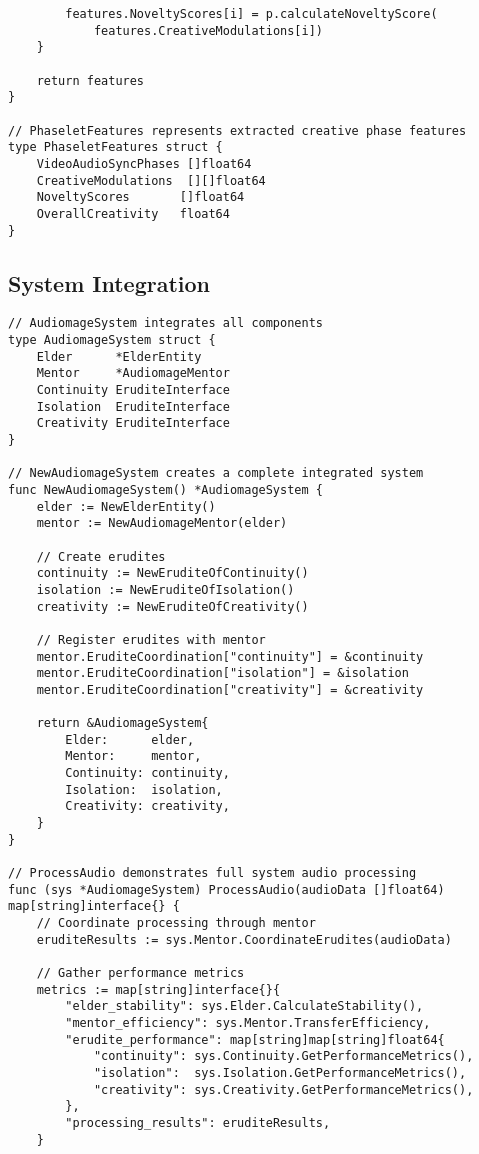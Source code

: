 \begin{tcolorbox}[colback=CodeBackground, colframe=DarkGray, title=Video-Audio Dataset Processing, fonttitle=\bfseries]
\begin{verbatim}
        features.NoveltyScores[i] = p.calculateNoveltyScore(
            features.CreativeModulations[i])
    }
    
    return features
}

// PhaseletFeatures represents extracted creative phase features
type PhaseletFeatures struct {
    VideoAudioSyncPhases []float64
    CreativeModulations  [][]float64
    NoveltyScores       []float64
    OverallCreativity   float64
}
\end{verbatim}
\end{tcolorbox}

\subsection{System Integration}

\begin{tcolorbox}[colback=CodeBackground, colframe=DarkGray, title=Complete System Integration, fonttitle=\bfseries]
\begin{verbatim}
// AudiomageSystem integrates all components
type AudiomageSystem struct {
    Elder      *ElderEntity
    Mentor     *AudiomageMentor
    Continuity EruditeInterface
    Isolation  EruditeInterface
    Creativity EruditeInterface
}

// NewAudiomageSystem creates a complete integrated system
func NewAudiomageSystem() *AudiomageSystem {
    elder := NewElderEntity()
    mentor := NewAudiomageMentor(elder)
    
    // Create erudites
    continuity := NewEruditeOfContinuity()
    isolation := NewEruditeOfIsolation()
    creativity := NewEruditeOfCreativity()
    
    // Register erudites with mentor
    mentor.EruditeCoordination["continuity"] = &continuity
    mentor.EruditeCoordination["isolation"] = &isolation
    mentor.EruditeCoordination["creativity"] = &creativity
    
    return &AudiomageSystem{
        Elder:      elder,
        Mentor:     mentor,
        Continuity: continuity,
        Isolation:  isolation,
        Creativity: creativity,
    }
}

// ProcessAudio demonstrates full system audio processing
func (sys *AudiomageSystem) ProcessAudio(audioData []float64) map[string]interface{} {
    // Coordinate processing through mentor
    eruditeResults := sys.Mentor.CoordinateErudites(audioData)
    
    // Gather performance metrics
    metrics := map[string]interface{}{
        "elder_stability": sys.Elder.CalculateStability(),
        "mentor_efficiency": sys.Mentor.TransferEfficiency,
        "erudite_performance": map[string]map[string]float64{
            "continuity": sys.Continuity.GetPerformanceMetrics(),
            "isolation":  sys.Isolation.GetPerformanceMetrics(),
            "creativity": sys.Creativity.GetPerformanceMetrics(),
        },
        "processing_results": eruditeResults,
    }
    

\end{verbatim}
\end{tcolorbox}
